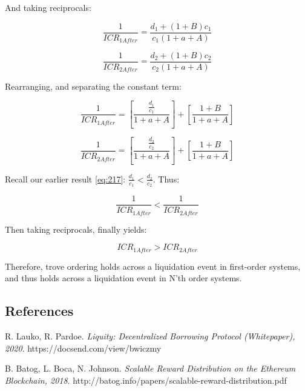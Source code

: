 \documentclass[reqno]{article}
\begin{document}
\bigskip
And taking reciprocals:

\begin{equation} 
    \frac{1}{ICR_{1After}}=\frac{d_1+\left(1+B\right)c_1}{c_1\left(1+a+A\right)}
\end{equation}

\begin{equation} 
    \frac{1}{ICR_{2After}}=\frac{d_2+\left(1+B\right)c_2}{c_2\left(1+a+A\right)}
\end{equation}

\bigskip
Rearranging, and separating the constant term:

\begin{equation} 
    \frac{1}{ICR_{1After}}=\left[\frac{\frac{d_1}{c_1}}{1+a+A}\right]+\left[\frac{1+B}{1+a+A}\right]
\end{equation}

\begin{equation} 
    \frac{1}{ICR_{2After}}=\left[\frac{\frac{d_2}{c_2}}{1+a+A}\right]+\left[\frac{1+B}{1+a+A}\right]
\end{equation}

\bigskip
Recall our earlier result \ref{eq:217}: $\frac{d_1}{c_1}<\frac{d_2}{c_2}$. Thus:

\begin{equation} 
    \frac{1}{ICR_{1After}}<\frac{1}{ICR_{2After}}
\end{equation}

\bigskip
Then taking reciprocals, finally yields:

\begin{equation} 
    ICR_{1After}>ICR_{2After}
\end{equation}

\bigskip
Therefore, trove ordering holds across a liquidation event in first-order systems, and thus holds across a liquidation event in N’th order systems.

\bigskip
\subsection*{References}

\begin{thebibliography}{9}

R. Lauko, R. Pardoe. 
\textit{Liquity: Decentralized Borrowing Protocol (Whitepaper), 2020}. 
https://docsend.com/view/bwiczmy

B. Batog, L. Boca, N. Johnson.
\textit{Scalable Reward Distribution on the Ethereum Blockchain, 2018}. 
http://batog.info/papers/scalable-reward-distribution.pdf


\end{thebibliography}
\end{document}
